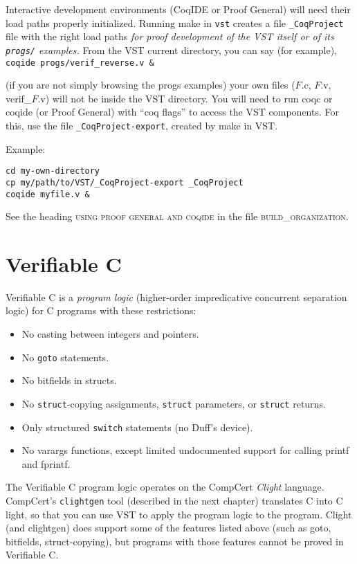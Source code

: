\documentclass[12pt,fleqn,openany,oneside,showtrims]{memoir}
\begin{document}
\label{loadpaths}
Interactive development environments (CoqIDE or Proof General)
will need their load paths properly initialized.
Running \textsf{make} in
\lstinline{vst} creates a file \lstinline{_CoqProject} file with
the right load paths \emph{for proof development of the VST itself
or of its \lstinline{progs/} examples.}
From the VST current directory, you can say (for example),
\newline
\lstinline{coqide progs/verif_reverse.v &}

(if you are not simply browsing the \textsf{progs} examples)
your own files ($F$.c, $F$.v, verif\_$F$.v) will not be inside
the VST directory.  You will need to run coqc or coqide (or Proof General)
with ``coq flags'' to access the VST components.  For this, use
the file \lstinline{_CoqProject-export},
created by \textsf{make} in VST.

Example:
\begin{lstlisting}
cd my-own-directory
cp my/path/to/VST/_CoqProject-export _CoqProject
coqide myfile.v &
\end{lstlisting}


See the heading
\textsc{using proof general and coqide}
in the file \textsc{build\_organization}.

\chapter{Verifiable C}
\label{refcard:verifiable-c}
Verifiable C is a \emph{program logic} (higher-order impredicative concurrent separation logic) for C programs with these restrictions:
\begin{itemize}
  \item No casting between integers and pointers.
  \item No \lstinline{goto} statements.
  \item No bitfields in structs.
  \item No \lstinline{struct}-copying assignments, \lstinline{struct} parameters, or \lstinline{struct} returns.
  \item Only structured \lstinline{switch} statements (no Duff's device).
  \item No varargs functions, except limited undocumented support for calling printf and fprintf.
\end{itemize}

The Verifiable C program logic operates on the CompCert \emph{Clight}
language.  CompCert's \lstinline{clightgen} tool (described in the
next chapter) translates C into C light, so that you can use VST
to apply the program logic to the program.  Clight (and clightgen) does support
some of the features listed above (such as goto, bitfields, struct-copying),
but programs with those features cannot be proved in Verifiable C. 
\end{document}
